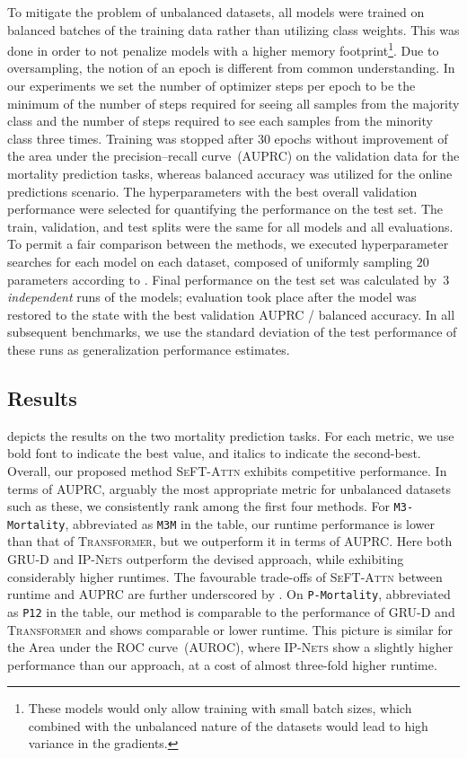 \documentclass{article}
\newcommand{\methodname}     {\textsc{SeFT}\xspace}
\newcommand{\dataset}[1]{\texttt{#1}}
\newcommand{\method}[1]{\textsc{#1}}
\begin{document}
To mitigate the problem of unbalanced datasets, all models were trained on
balanced batches of the training data rather than utilizing class weights. This
was done in order to not penalize models with a higher memory footprint\footnote{These
models would only allow training with small batch sizes, which combined with
the unbalanced nature of the datasets would lead to high variance in the
gradients.}. Due to oversampling, the notion of an epoch is different from
common understanding. In our experiments we set the number of optimizer steps
per epoch to be the minimum of the number of steps required for seeing all
samples from the majority class and the number of steps required to see each
samples from the minority class three times.
Training was stopped after $30$ epochs without improvement of the area under
the precision--recall curve~(AUPRC) on the validation data for the mortality
prediction tasks, whereas balanced accuracy was utilized for the online
predictions scenario. The hyperparameters with the best overall validation
performance were selected for quantifying the performance on the test set. The
train, validation, and test splits were the same for all models and all
evaluations.
To permit a fair comparison between the methods, we executed hyperparameter
searches for each model on each dataset, composed of uniformly sampling $20$
parameters according to .
Final performance on the test set was calculated by~$3$ \emph{independent} runs
of the models; evaluation took place after the model was restored to the state
with the best validation AUPRC / balanced accuracy. In all subsequent
benchmarks, we use the standard deviation of the test performance of these runs
as generalization performance estimates.

\subsection{Results}\label{sec:results}


 depicts the results on the two mortality
prediction tasks. For each metric, we use bold font to indicate the best
value, and italics to indicate the second-best. Overall, our proposed
method \method{\methodname-Attn} exhibits competitive performance. In
terms of AUPRC, arguably the most appropriate metric for unbalanced
datasets such as these, we consistently rank among the first four
methods.
For \dataset{M3-Mortality}, abbreviated as \dataset{M3M} in the table, our
runtime performance is lower than that of \method{Transformer}, but we
outperform it in terms of AUPRC.  Here both \method{GRU-D} and \method{IP-Nets}
outperform the devised approach, while exhibiting considerably higher runtimes.
The favourable trade-offs of \method{\methodname-Attn} between runtime and
AUPRC are further underscored by .
On \dataset{P-Mortality}, abbreviated as \dataset{P12} in the table, our
method is comparable to the performance of \method{GRU-D} and
\method{Transformer} and shows comparable or lower runtime.  This
picture is similar for the Area under the ROC curve~(AUROC), where
\method{IP-Nets} show a slightly higher performance than our approach, at
a cost of almost three-fold higher runtime.
\end{document}
